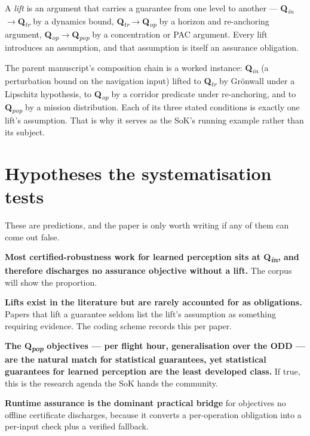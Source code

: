 \documentclass[11pt,a4paper]{article}
\newcommand{\Qlvl}[1]{\textbf{Q}\textsubscript{\textit{#1}}}
\newcommand{\Qin}{\Qlvl{in}}
\newcommand{\Qtr}{\Qlvl{tr}}
\newcommand{\Qop}{\Qlvl{op}}
\newcommand{\Qpop}{\Qlvl{pop}}
\begin{document}
\begin{definition}[Lift]
A \emph{lift} is an argument that carries a guarantee from one level to another
--- \Qin$\to$\Qtr{} by a dynamics bound, \Qtr$\to$\Qop{} by a horizon and
re-anchoring argument, \Qop$\to$\Qpop{} by a concentration or PAC argument. Every
lift introduces an assumption, and that assumption is itself an assurance
obligation.
\end{definition}

\noindent
The parent manuscript's composition chain is a worked instance:
\Qin{} (a perturbation bound on the navigation input) lifted to \Qtr{} by
Gr\"onwall under a Lipschitz hypothesis, to \Qop{} by a corridor predicate under
re-anchoring, and to \Qpop{} by a mission distribution. Each of its three stated
conditions is exactly one lift's assumption. That is why it serves as the SoK's
running example rather than its subject.

\section{Hypotheses the systematisation tests}
These are predictions, and the paper is only worth writing if any of them can
come out false.

\begin{description}[leftmargin=2.4em,style=nextline]
\item[H1] \textbf{Most certified-robustness work for learned perception sits at
  \Qin, and therefore discharges no assurance objective without a lift.} The
  corpus will show the proportion.
\item[H2] \textbf{Lifts exist in the literature but are rarely accounted for as
  obligations.} Papers that lift a guarantee seldom list the lift's assumption as
  something requiring evidence. The coding scheme records this per paper.
\item[H3] \textbf{The \Qpop{} objectives --- per flight hour, generalisation
  over the ODD --- are the natural match for statistical guarantees, yet
  statistical guarantees for learned perception are the least developed
  class.} If true, this is the research agenda the SoK hands the community.
\item[H4] \textbf{Runtime assurance is the dominant practical bridge} for
  objectives no offline certificate discharges, because it converts a
  per-operation obligation into a per-input check plus a verified fallback.
\end{description}
\end{document}
